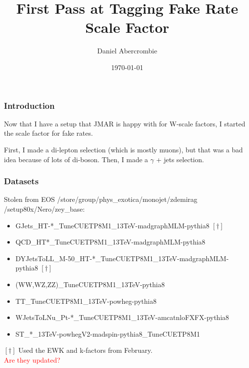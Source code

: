 \documentclass{beamer}
\author[D. Abercrombie]{
  Daniel Abercrombie
}
\title{\bf \sffamily First Pass at Tagging Fake Rate Scale Factor}
\date{\today}
\begin{document}
\begin{frame}[nonumbering]
  \titlepage
\end{frame}

\begin{frame}
  \frametitle{Introduction}
  Now that I have a setup that JMAR is happy with for W-scale factors,
  I started the scale factor for fake rates.

  \vspace{12pt}

  First, I made a di-lepton selection (which is mostly muons),
  but that was a bad idea because of lots of di-boson.
  Then, I made a $\gamma$ + jets selection.
\end{frame}

\begin{frame}
  \frametitle{Datasets}

  Stolen from EOS /store/group/phys\_exotica/monojet/zdemirag \\ /setup80x/Nero/zey\_base:

  \vspace{12pt}

  {\scriptsize
    \begin{itemize}
    \item GJets\_HT-*\_TuneCUETP8M1\_13TeV-madgraphMLM-pythia8 $[\dagger]$
    \item QCD\_HT*\_TuneCUETP8M1\_13TeV-madgraphMLM-pythia8
    \item DYJetsToLL\_M-50\_HT-*\_TuneCUETP8M1\_13TeV-madgraphMLM-pythia8 $[\dagger]$
    \item (WW,WZ,ZZ)\_TuneCUETP8M1\_13TeV-pythia8
    \item TT\_TuneCUETP8M1\_13TeV-powheg-pythia8
    \item WJetsToLNu\_Pt-*\_TuneCUETP8M1\_13TeV-amcatnloFXFX-pythia8
    \item ST\_*\_13TeV-powhegV2-madspin-pythia8\_TuneCUETP8M1
    \end{itemize}
  }
  $[\dagger]$ Used the EWK and k-factors from February. \\
  \textcolor{red}{Are they updated?}

\end{frame}
\end{document}
